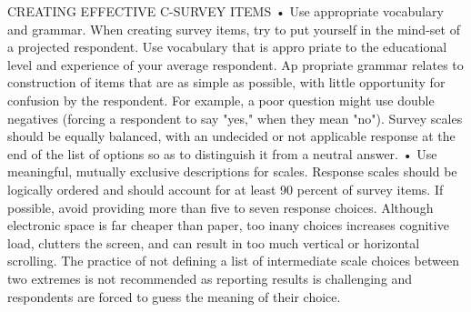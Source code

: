 \documentclass{beamer}
\begin{document}
\begin{frame}{CREATING EFFECTIVE C-SURVEY ITEMS}
• Use appropriate vocabulary and grammar. When creating survey items, try to put 
yourself in the mind-set of a projected respondent. Use vocabulary that is appro priate to 
the educational level and experience of your average respondent. Ap propriate grammar relates 
to construction of items that are as simple as possible, with little opportunity for confusion 
by the respondent. For example, a poor question might use double negatives (forcing a respondent to 
say "yes," when they mean "no"). Survey scales should be equally balanced, with an undecided or not 
applicable response at the end of the list of options so as to distinguish it from a neutral answer. 
• Use meaningful, mutually exclusive descriptions for scales. Response scales should be 
logically ordered and should account for at least 90 percent of survey items. If possible, 
avoid providing more than five to seven response choices. Although electronic space is far cheaper 
than paper, too inany choices increases cognitive load, clutters the screen, and can result in too much 
vertical or horizontal scrolling. The practice of not defining a list of intermediate scale choices 
between two extremes is not recommended as reporting results is challenging and respondents are forced 
to guess the meaning of their choice. 
\end{frame}
\end{document}
